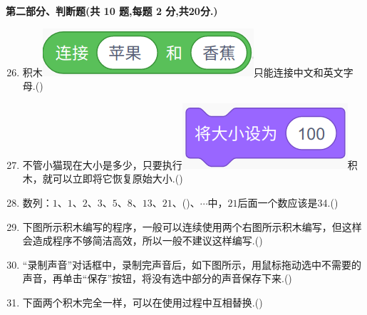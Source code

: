 \documentclass[10pt, a4paper]{article}
\begin{document}
    {\noindent\textbf{第二部分、判断题(共 10 题,每题 2 分,共20分.)}}
    \begin{enumerate}
        \setcounter{enumi}{25}
        \item 积木\includegraphics[width=.15\textwidth]{26.png}只能连接中文和英文字母.(\qquad)

        \item 不管小猫现在大小是多少，只要执行\includegraphics[width=.1\textwidth]{27.png}积木，就可以立即将它恢复原始大小.(\qquad)

        \item 数列：$1$、$1$、$2$、$3$、$5$、$8$、$13$、$21$、(\quad)、$\cdots$中，$21$后面一个数应该是34.(\qquad)
  
        \item 下图所示积木编写的程序，一般可以连续使用两个右图所示积木编写，但这样会造成程序不够简洁高效，所以一般不建议这样编写.(\qquad)
        
        \item “录制声音”对话框中，录制完声音后，如下图所示，用鼠标拖动选中不需要的声音，再单击“保存”按钮，将没有选中部分的声音保存下来.(\qquad)
        
        \item 下面两个积木完全一样，可以在使用过程中互相替换.(\qquad)
        

\end{enumerate}
\end{document}
